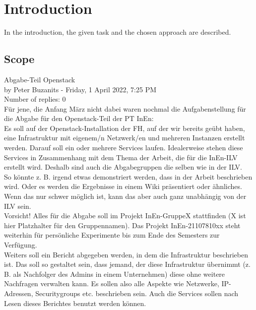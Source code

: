 \section{Introduction}
In the introduction, the given task and the chosen approach are described.

\subsection{Scope}

Abgabe-Teil Openstack \\
by Peter Buzanits - Friday, 1 April 2022, 7:25 PM \\
Number of replies: 0 \\

\noindent
Für jene, die Anfang März nicht dabei waren nochmal die Aufgabenstellung für
die Abgabe für den Openstack-Teil der PT InEn: \\

\noindent
Es soll auf der Openstack-Installation der FH, auf der wir bereits geübt
haben, eine Infrastruktur mit eigenem/n Netzwerk/en und mehreren Instanzen
erstellt werden. Darauf soll ein oder mehrere Services laufen. Idealerweise
stehen diese Services in Zusammenhang mit dem Thema der Arbeit, die für die
InEn-ILV erstellt wird. Deshalb sind auch die Abgabegruppen die selben wie in
der ILV. \\

\noindent
So könnte z. B. irgend etwas demonstriert werden, dass in der Arbeit
beschrieben wird. Oder es werden die Ergebnisse in einem Wiki präsentiert oder
ähnliches. Wenn das nur schwer möglich ist, kann das aber auch ganz
unabhängig von der ILV sein. \\

\noindent
Vorsicht! Alles für die Abgabe soll im Projekt InEn-GruppeX stattfinden (X ist
hier Platzhalter für den Gruppennamen). Das Projekt InEn-21107810xx steht
weiterhin für persönliche Experimente bis zum Ende des Semesters zur
Verfügung. \\

\noindent
Weiters soll ein Bericht abgegeben werden, in dem die Infrastruktur beschrieben
ist. Das soll so gestaltet sein, dass jemand, der diese Infrastruktur
übernimmt (z. B. als Nachfolger des Admins in einem Unternehmen) diese ohne
weitere Nachfragen verwalten kann. Es sollen also alle Aspekte wie Netzwerke,
IP-Adressen, Securitygroups etc. beschrieben sein. Auch die Services sollen
nach Lesen dieses Berichtes benutzt werden können. \\

